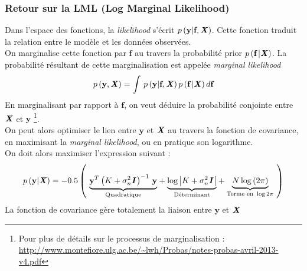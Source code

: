\documentclass[a4paper,12pt]{report}
\newcommand{\bepar}[1]{
	\left( #1 \right)  
}
\numberwithin{equation}{section} %
\begin{document}
\newpage

\subsubsection*{Retour sur la LML (Log Marginal Likelihood)}
\noindent Dans l'espace des fonctions, la \textit{likelihood} s'écrit $\displaystyle p\bepar{\textbf{y} | \textbf{f},\textbf{\textit{X}}}$. Cette fonction traduit la relation entre le modèle et les données observées. \\
On marginalise cette fonction par $\textbf{f}$ au travers la probabilité prior $p\bepar{\textbf{f}\,|\textbf{\textit{X}}}$. La probabilité résultant de cette marginalisation est appelée \textit{marginal likelihood}
\begin{equation}
p\bepar{\textbf{y}, \textbf{\textit{X}}} = \int \, p\bepar{\textbf{y} | \textbf{f},\textbf{\textit{X}}} p\bepar{\textbf{f}\,|\textbf{\textit{X}}} d\textbf{f}
\end{equation}
En marginalisant par rapport à $\textbf{f}$, on veut déduire la probabilité conjointe entre $\textbf{\textit{X}}$ et $\textbf{y}$ \footnote{Pour plus de détails sur le processus de marginalisation : \url{http://www.montefiore.ulg.ac.be/~lwh/Probas/notes-probas-avril-2013-v4.pdf}}.\\
On peut alors optimiser le lien entre $\textbf{y}$ et $\textbf{\textit{X}}$ au travers la fonction de covariance, en maximisant la \textit{marginal likelihood}, ou en pratique son logarithme.\\
On doit alors maximiser l'expression suivant :
\begin{equation}
p\bepar{\textbf{y} | \textbf{\textit{X}}} = -0.5 \bepar{~ \underset{\text{Quadratique}}{\underbrace{\textbf{y}^T\bepar{K + \sigma_n^2\textit{\textbf{I}\,}}^{-1}\, \textbf{y}}} + \underset{\text{Déterminant}}{\underbrace{\log \left | K + \sigma_n^2\textbf{\textit{I}}\right |}} + \underset{\text{Terme en }\log{2\pi}}{\underbrace{N \log\bepar{2\pi}}}~ }
\end{equation}  
La fonction de covariance gère totalement la liaison entre $\textbf{y}$ et $\textbf{\textit{X}}$
\newpage
\end{document}
